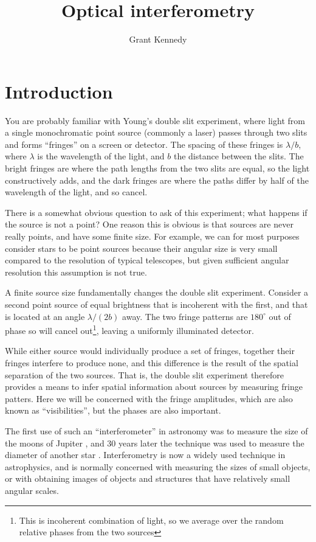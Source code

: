 \documentclass[11pt]{article}
\title{Optical interferometry}
\author{Grant Kennedy}
\begin{document}
\maketitle

\section{Introduction}

You are probably familiar with Young's double slit experiment, where light from a single monochromatic point source (commonly a laser) passes through two slits and forms ``fringes'' on a screen or detector. The spacing of these fringes is $\lambda/b$, where $\lambda$ is the wavelength of the light, and $b$ the distance between the slits. The bright fringes are where the path lengths from the two slits are equal, so the light constructively adds, and the dark fringes are where the paths differ by half of the wavelength of the light, and so cancel.

There is a somewhat obvious question to ask of this experiment; what happens if the source is not a point? One reason this is obvious is that sources are never really points, and have some finite size. For example, we can for most purposes consider stars to be point sources because their angular size is very small compared to the resolution of typical telescopes, but given sufficient angular resolution this assumption is not true.

A finite source size fundamentally changes the double slit experiment. Consider a second point source of equal brightness that is incoherent with the first, and that is located at an angle $\lambda/(2b)$ away. The two fringe patterns are $180^\circ$ out of phase so will cancel out\footnote{This is incoherent combination of light, so we average over the random relative phases from the two sources}, leaving a uniformly illuminated detector.

While either source would individually produce a set of fringes, together their fringes interfere to produce none, and this difference is the result of the spatial separation of the two sources. That is, the double slit experiment therefore provides a means to infer spatial information about sources by measuring fringe patters. Here we will be concerned with the fringe amplitudes, which are also known as ``visibilities'', but the phases are also important.

The first use of such an ``interferometer'' in astronomy was to measure the size of the moons of Jupiter \citep{1891PASP....3..274M,1891Natur..45..160M}, and 30 years later the technique was used to measure the diameter of another star \citep{1921ApJ....53..249M}. Interferometry is now a widely used technique in astrophysics, and is normally concerned with measuring the sizes of small objects, or with obtaining images of objects and structures that have relatively small angular scales.
\end{document}
